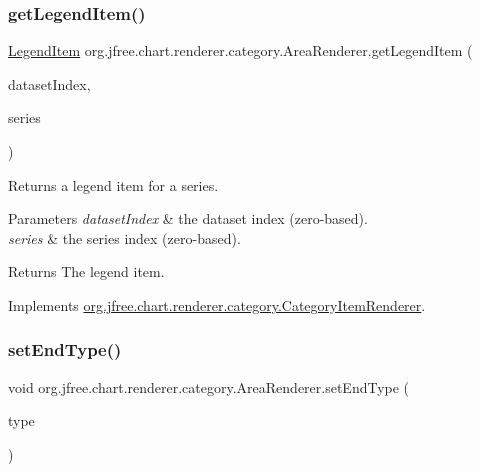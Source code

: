 \subsubsection{\texorpdfstring{get\+Legend\+Item()}{getLegendItem()}}
{\footnotesize\ttfamily \mbox{\hyperlink{classorg_1_1jfree_1_1chart_1_1_legend_item}{Legend\+Item}} org.\+jfree.\+chart.\+renderer.\+category.\+Area\+Renderer.\+get\+Legend\+Item (\begin{DoxyParamCaption}\item[{int}]{dataset\+Index,  }\item[{int}]{series }\end{DoxyParamCaption})}

Returns a legend item for a series.


\begin{DoxyParams}{Parameters}
{\em dataset\+Index} & the dataset index (zero-\/based). \\
\hline
{\em series} & the series index (zero-\/based).\\
\hline
\end{DoxyParams}
\begin{DoxyReturn}{Returns}
The legend item. 
\end{DoxyReturn}


Implements \mbox{\hyperlink{interfaceorg_1_1jfree_1_1chart_1_1renderer_1_1category_1_1_category_item_renderer_ab9269f34c8b4859211e4f4472636c93c}{org.\+jfree.\+chart.\+renderer.\+category.\+Category\+Item\+Renderer}}.

\mbox{\label{classorg_1_1jfree_1_1chart_1_1renderer_1_1category_1_1_area_renderer_ac5e2ecaa5a1cf0d8a49f1915b97dbe39}} 
\subsubsection{\texorpdfstring{set\+End\+Type()}{setEndType()}}
{\footnotesize\ttfamily void org.\+jfree.\+chart.\+renderer.\+category.\+Area\+Renderer.\+set\+End\+Type (\begin{DoxyParamCaption}\item[{\mbox{\hyperlink{classorg_1_1jfree_1_1chart_1_1renderer_1_1_area_renderer_end_type}{Area\+Renderer\+End\+Type}}}]{type }\end{DoxyParamCaption})}

